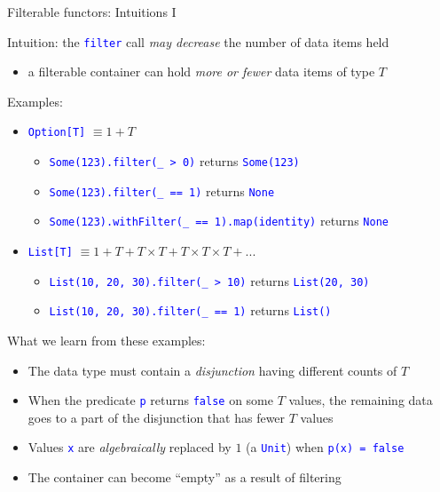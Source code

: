 \documentclass[english]{beamer}
\begin{document}
\begin{frame}{Filterable functors: Intuitions I}

Intuition: the \texttt{\textcolor{blue}{\footnotesize{}filter}} call
\emph{may decrease} the number of data items held
\begin{itemize}
\item a filterable container can hold \emph{more or fewer} data items of
type $T$
\end{itemize}
Examples:
\begin{itemize}
\item \texttt{\textcolor{blue}{\footnotesize{}Option{[}T{]}}} $\equiv1+T$
\begin{itemize}
\item \texttt{\textcolor{blue}{\footnotesize{}Some(123).filter(\_ > 0)}}
returns \texttt{\textcolor{blue}{\footnotesize{}Some(123)}} 
\item \texttt{\textcolor{blue}{\footnotesize{}Some(123).filter(\_ == 1)}}
returns \texttt{\textcolor{blue}{\footnotesize{}None}} 
\item \texttt{\textcolor{blue}{\footnotesize{}Some(123).withFilter(\_ ==
1).map(identity)}} returns \texttt{\textcolor{blue}{\footnotesize{}None}} 
\end{itemize}
\item \texttt{\textcolor{blue}{\footnotesize{}List{[}T{]}}} $\equiv1+T+T\times T+T\times T\times T+...$
\begin{itemize}
\item \texttt{\textcolor{blue}{\footnotesize{}List(10, 20, 30).filter(\_
> 10)}} returns \texttt{\textcolor{blue}{\footnotesize{}List(20, 30)}} 
\item \texttt{\textcolor{blue}{\footnotesize{}List(10, 20, 30).filter(\_
== 1)}} returns \texttt{\textcolor{blue}{\footnotesize{}List()}} 
\end{itemize}
\end{itemize}
What we learn from these examples:
\begin{itemize}
\item The data type must contain a \emph{disjunction} having different counts
of $T$
\item When the predicate \texttt{\textcolor{blue}{\footnotesize{}p}} returns
\texttt{\textcolor{blue}{\footnotesize{}false}} on some $T$ values,
the remaining data goes to a part of the disjunction that has fewer
$T$ values
\item Values \texttt{\textcolor{blue}{\footnotesize{}x}} are \emph{algebraically}
replaced by $1$ (a \texttt{\textcolor{blue}{\footnotesize{}Unit}})
when \texttt{\textcolor{blue}{\footnotesize{}p(x) = false}} 
\item The container can become ``empty'' as a result of filtering
\end{itemize}
\end{frame}
\end{document}
